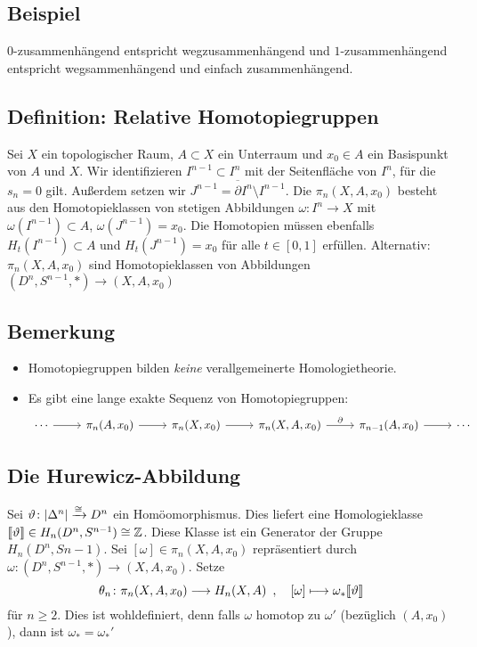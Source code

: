 \subsection{Beispiel} %
\label{sub:1518}
$0$-zusammenhängend entspricht wegzusammenhängend und $1$-zusammenhängend entspricht wegsammenhängend und einfach zusammenhängend.

\subsection{Definition: Relative Homotopiegruppen} %
\label{sub:1519}
Sei $X$ ein topologischer Raum, $A \subset X$ ein Unterraum und $x_0 \in A$ ein Basispunkt von $A$ und $X$. Wir identifizieren $I^{n-1} \subset I^n$ mit der Seitenfläche 
von $I^n$, für die $s_n=0$ gilt. Außerdem setzen wir $\overline{J^{n-1}=\partial I^n \setminus I^{n-1}}$. Die  $\pi_n(X,A,x_0)$ besteht aus 
den Homotopieklassen von stetigen Abbildungen $\omega\colon I^n  \to X$ mit $\omega(I^{n-1}) \subset A$, $\omega(J^{n-1})=x_0$. Die Homotopien müssen ebenfalls 
$H_t(I^{n-1}) \subset A$ und $H_t(J^{n-1}) =x_0$ für alle $t \in [0,1]$ erfüllen.
Alternativ: $\pi_n(X,A,x_0)$ sind Homotopieklassen von Abbildungen $(D^n,S^{n-1},*) \to (X,A,x_0)$

\subsection{Bemerkung} %
\label{sub:1520}
\begin{itemize}
	\item Homotopiegruppen bilden \emph{keine} verallgemeinerte Homologietheorie.
	\item Es gibt eine lange exakte Sequenz von Homotopiegruppen:
	\[
		\begin{tikzcd}
			\cdots \rar & \pi_n(A,x_0) \rar & \pi_n(X,x_0) \rar & \pi_n(X,A,x_0) \rar["\partial"] & \pi_{n-1}(A,x_0) \rar & \cdots
		\end{tikzcd}
	\]
\end{itemize}

\subsection{Die Hurewicz-Abbildung} %
\label{sub:1521}
Sei $\vartheta \colon \abs*{\Delta^n} \xrightarrow{\cong} D^n$ ein Homöomorphismus. Dies liefert eine Homologieklasse 
$\llbracket\vartheta\rrbracket \in H_n(D^n,S^{n-1}) \cong \mathbb{Z}$. Diese Klasse ist ein Generator der Gruppe $H_n(D^n,S{n-1})$. Sei $[\omega] \in \pi_n(X,A,x_0)$
repräsentiert durch $\omega \colon (D^n,S^{n-1},*) \to (X,A,x_0)$. Setze 
\[
	\theta_n \colon \pi_n(X,A,x_0) \longrightarrow H_n(X,A) \enspace, \quad [\omega] \longmapsto \omega_*\llbracket\vartheta\rrbracket 
\]
für $n \ge 2$. Dies ist wohldefiniert, denn falls $\omega$ homotop zu $\omega'$ (bezüglich $(A,x_0)$), dann ist $\omega_*=\omega_*'$

